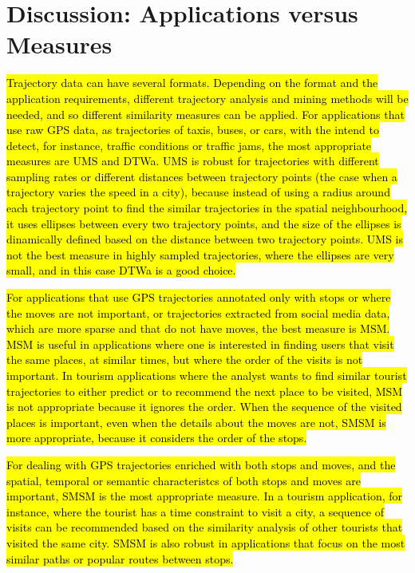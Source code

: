 \documentclass[12pt]{article}
\begin{document}

\section{Discussion: Applications versus Measures}\label{sec:discussion}


\hl{Trajectory data can have several formats. Depending on the format and the application requirements, different trajectory analysis and mining methods will be needed, and so different similarity measures can be applied. For applications that use raw GPS data, as trajectories of taxis, buses, or cars, with the intend to detect, for instance, traffic conditions or traffic jams, the most appropriate measures are UMS and DTWa. UMS is robust for trajectories with different sampling rates or different distances between trajectory points (the case when a trajectory varies the speed in a city), because instead of using a radius around each trajectory point to find the similar trajectories in the spatial neighbourhood, it uses ellipses between every two trajectory points, and the size of the ellipses is dinamically defined based on the distance between two trajectory points. UMS is not the best measure in highly sampled trajectories, where the ellipses are very small, and in this case DTWa is  a good choice.}

\hl{For applications that use GPS trajectories annotated only with stops or where the moves are not important, or trajectories extracted from social media data, which are more sparse and that do not have moves, the best measure is MSM. MSM is useful in applications where one is interested in finding users that visit the same places, at similar times, but where the order of the visits is not important. In tourism applications where the analyst wants to find similar tourist trajectories to either predict or to recommend the next place to be visited, MSM is not appropriate because it ignores the order. When the sequence of the visited places is important, even when the details about the moves are not, SMSM is more appropriate, because it considers the order of the stops.}

\hl{For dealing with GPS trajectories enriched with both stops and moves, and the spatial, temporal or semantic characteristcs of both stops and moves are important, SMSM is the most appropriate measure. In a tourism application, for instance, where the tourist has a time constraint to visit a city, a sequence of visits can be recommended based on the similarity analysis of other tourists that visited the same city. SMSM is also robust in applications that focus on the most similar paths or popular routes between stops.}
\end{document}
